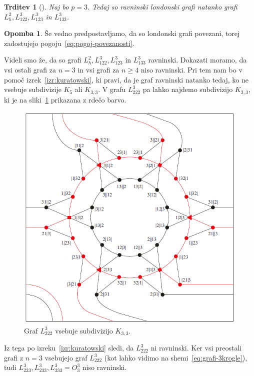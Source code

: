 \documentclass[12pt,a4paper]{amsart}
\theoremstyle{definition} %
\newtheorem{opomba}[definicija]{Opomba}
\theoremstyle{plain} %
\newtheorem{trditev}[definicija]{Trditev}
\begin{document}
\begin{trditev}[{\cite[Proposition~7.4.]{bib:tohmyths}}]
    Naj bo $p=3$. Tedaj so ravninski londonski grafi natanko grafi $L_h^2, L_{122}^3, L_{123}^3$ in $L_{133}^3$.
\end{trditev}

\begin{opomba}
    Še vedno predpostavljamo, da so londonski grafi povezani, torej zadostujejo pogoju~\eqref{eq:pogoj-povezanosti}.
\end{opomba}

\proof
    Videli smo že, da so grafi $L_h^2, L_{122}^3, L_{123}^3$ in $L_{133}^3$ ravninski. Dokazati moramo, da vsi ostali grafi za $n=3$ in vsi grafi za $n \geq 4$ niso ravninski. Pri tem nam bo v pomoč izrek~\ref{izr:kuratowski}, ki pravi, da je graf ravninski natanko tedaj, ko ne vsebuje subdivizije $K_5$ ali $K_{3,3}$. V grafu $L_{222}^3$ pa lahko najdemo subdivizijo $K_{3,3}$, ki je na sliki~\ref{fig:L222-subdivizija} prikazana z rdečo barvo. 
    \begin{figure}[h]
        \centering
        \includegraphics[width=400pt]{img/tolgraph-O^3_222-subdivision.png}
        \caption{Graf $L_{222}^3$ vsebuje subdivizijo $K_{3,3}$.}
        \label{fig:L222-subdivizija}
    \end{figure}
    Iz tega po izreku~\ref{izr:kuratowski} sledi, da $L_{222}^3$ ni ravninski. Ker vsi preostali grafi z $n = 3$ vsebujejo graf $L_{222}^3$ (kot lahko vidimo na shemi~\eqref{eq:grafi-3krogle}), tudi $L_{223}^3, L_{233}^3, L_{333}^3=O^3_3$ niso ravninski.
    
\end{document}
